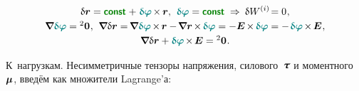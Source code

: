 \begin{otherlanguage}{russian}
\nopagebreak\vspace{-0.1em}\begin{equation*}
\begin{array}{c}
\variation{\currentvector}
= \boldconst \hspace{.1ex}
+ \hspace{.1ex} \littlerotationvector \hspace{-0.2ex} \times \hspace{-0.12ex} \bm{r} ,
\:\,
\littlerotationvector = \boldconst
\hspace{.64ex}\Rightarrow\hspace{.5ex}
\variation{\internalwork} \hspace{-0.2ex}
= 0 \hspace{.1ex} ,
\\[.25em]
%
\boldnabla \littlerotationvector
= {^2\bm{0}}
\hspace{.1ex} ,
\:\,
\boldnabla \variation{\currentvector}
= \hspace{-0.25ex} \boldnabla \littlerotationvector %
\hspace{-0.2ex} \times \hspace{-0.2ex} \bm{r}
- \hspace{-0.25ex} \boldnabla \bm{r} \hspace{-0.2ex} \times \hspace{-0.2ex} \littlerotationvector
= - \bm{E} \hspace{-0.2ex} \times \hspace{-0.2ex} \littlerotationvector
= - \hspace{.2ex} \littlerotationvector \hspace{-0.2ex} \times \hspace{-0.2ex} \bm{E}
\hspace{.1ex} ,
\\[.25em]
%
\boldnabla \variation{\currentvector}
+ \littlerotationvector \hspace{-0.2ex} \times \hspace{-0.2ex} \bm{E}
= {^2\bm{0}}
\hspace{.1ex} .
\end{array}
\end{equation*}

К~нагрузкам. Несимметричные тензоры напряжения, силового~$\forcestresstensor$ и моментного~$\bm{\mu}$, введём как множители Lagrange’а:


\end{otherlanguage}
